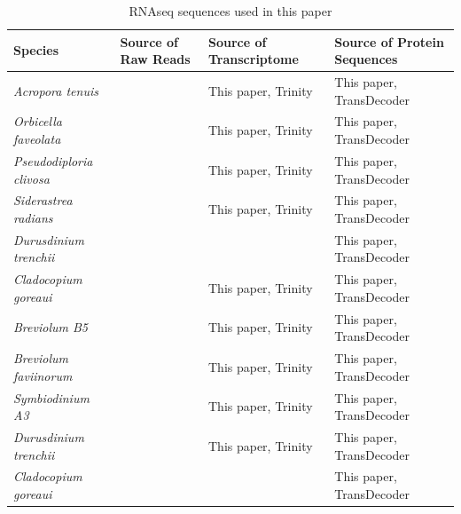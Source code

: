 \begin{table}
  \caption{RNAseq sequences used in this paper}
  \centering
  \begin{tabular}{llll}
    \toprule
      Species                         & Source of Raw Reads    & Source of Transcriptome       & Source of Protein Sequences \\
      \midrule
      \textit{Acropora tenuis}        & \cite{pm32}            & This paper, Trinity           & This paper, TransDecoder    \\
      \textit{Orbicella faveolata}    & \cite{pm34}            & This paper, Trinity           & This paper, TransDecoder    \\
      \textit{Pseudodiploria clivosa} & \cite{pm34}            & This paper, Trinity           & This paper, TransDecoder    \\
      \textit{Siderastrea radians}    & \cite{pm34}            & This paper, Trinity           & This paper, TransDecoder    \\
      \textit{Durusdinium trenchii}   & \cite{pm31}            & \cite{pm31}                   & This paper, TransDecoder    \\
      \textit{Cladocopium goreaui}    & \cite{pm32}            & This paper, Trinity           & This paper, TransDecoder    \\
      \textit{Breviolum B5}           & \cite{pm34}            & This paper, Trinity           & This paper, TransDecoder    \\
      \textit{Breviolum faviinorum}   & \cite{pm34}            & This paper, Trinity           & This paper, TransDecoder    \\
      \textit{Symbiodinium A3}        & \cite{pm34}            & This paper, Trinity           & This paper, TransDecoder    \\
      \textit{Durusdinium trenchii}   & \cite{pm35}            & This paper, Trinity           & This paper, TransDecoder    \\
      \textit{Cladocopium goreaui}    & \cite{pm36}            & \cite{pm36}                   & This paper, TransDecoder    \\
    \bottomrule
    \end{tabular}
    \label{tab:rnapapers}
\end{table}
